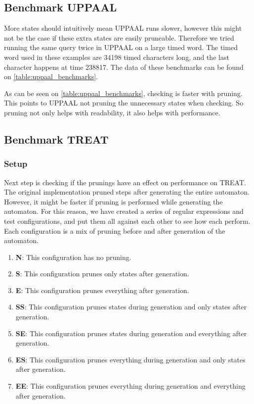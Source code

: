 \subsection{Benchmark UPPAAL}\label{sub:benchmark_uppaal}
More states should intuitively mean UPPAAL runs slower, however this might not be the case if these extra states are easily pruneable.
Therefore we tried running the same query twice in UPPAAL on a large timed word.
The timed word used in these examples are 34198 timed characters long, and the last character happens at time 238817.
The data of these benchmarks can be found on \cref{table:uppaal_benchmarks}.



As can be seen on \cref{table:uppaal_benchmarks}, checking is faster with pruning.
This points to UPPAAL not pruning the unnecessary states when checking.
So pruning not only helps with readability, it also helps with performance. 

\subsection{Benchmark TREAT}
\subsubsection{Setup}
Next step is checking if the prunings have an effect on performance on TREAT.
The original implementation pruned steps after generating the entire automaton.
However, it might be faster if pruning is performed while generating the automaton.
For this reason, we have created a series of regular expressions and test configurations, and put them all against each other to see how each perform.
Each configuration is a mix of pruning before and after generation of the automaton.

\begin{enumerate}
    \item \textbf{N}: This configuration has no pruning.
    \item \textbf{S}: This configuration prunes only states after generation.
    \item \textbf{E}: This configuration prunes everything after generation.
    \item \textbf{SS}: This configuration prunes states during generation and only states after generation.
    \item \textbf{SE}: This configuration prunes states during generation and everything after generation.
    \item \textbf{ES}: This configuration prunes everything during generation and only states after generation.
    \item \textbf{EE}: This configuration prunes everything during generation and everything after generation.
\end{enumerate}


